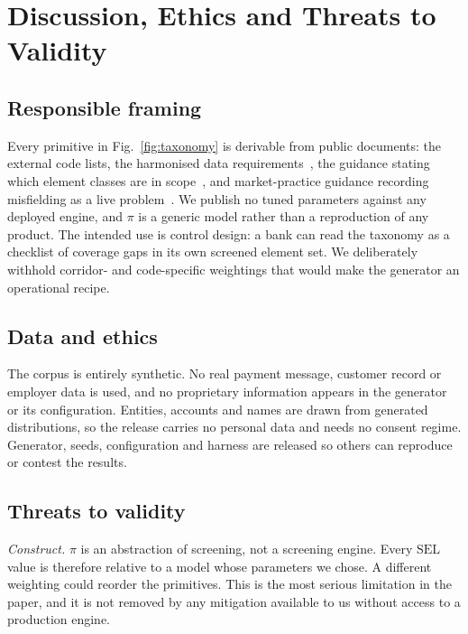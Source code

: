 \documentclass[conference]{IEEEtran}
\begin{document}
\section{Discussion, Ethics and Threats to Validity}
\label{sec:disc}

\subsection{Responsible framing}
Every primitive in Fig.~\ref{fig:taxonomy} is derivable from public
documents: the external code lists, the harmonised data
requirements~\cite{cpmi2026}, the guidance stating which element classes are
in scope~\cite{swiftgp2021}, and market-practice guidance recording
misfielding as a live problem~\cite{pmpg2024}. We publish no tuned
parameters against any deployed engine, and $\pi$ is a generic model rather
than a reproduction of any product. The intended use is control design: a
bank can read the taxonomy as a checklist of coverage gaps in its own
screened element set. We deliberately withhold corridor- and code-specific
weightings that would make the generator an operational recipe.

\subsection{Data and ethics}
The corpus is entirely synthetic. No real payment message, customer record
or employer data is used, and no proprietary information appears in the
generator or its configuration. Entities, accounts and names are drawn from
generated distributions, so the release carries no personal data and needs
no consent regime. Generator, seeds, configuration and harness are released
so others can reproduce or contest the results.

\subsection{Threats to validity}
\emph{Construct.} $\pi$ is an abstraction of screening, not a screening
engine. Every $\mathrm{SEL}$ value is therefore relative to a model whose
parameters we chose. A different weighting could reorder the primitives. This
is the most serious limitation in the paper, and it is not removed by any
mitigation available to us without access to a production engine.
\end{document}
